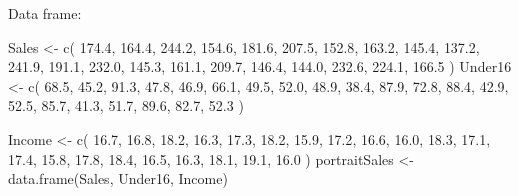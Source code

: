 \documentclass[
]{article}
\newenvironment{Shaded}{\begin{snugshade}}{\end{snugshade}}
\newcommand{\FloatTok}[1]{\textcolor[rgb]{0.00,0.00,0.81}{#1}}
\newcommand{\FunctionTok}[1]{\textcolor[rgb]{0.00,0.00,0.00}{#1}}
\newcommand{\NormalTok}[1]{#1}
\newcommand{\OtherTok}[1]{\textcolor[rgb]{0.56,0.35,0.01}{#1}}
\begin{document}
\hfill\break
Data frame:

\begin{Shaded}
\begin{Highlighting}[]
\NormalTok{Sales }\OtherTok{\textless{}{-}} \FunctionTok{c}\NormalTok{(}
  \FloatTok{174.4}\NormalTok{,}
  \FloatTok{164.4}\NormalTok{,}
  \FloatTok{244.2}\NormalTok{,}
  \FloatTok{154.6}\NormalTok{,}
  \FloatTok{181.6}\NormalTok{,}
  \FloatTok{207.5}\NormalTok{,}
  \FloatTok{152.8}\NormalTok{,}
  \FloatTok{163.2}\NormalTok{,}
  \FloatTok{145.4}\NormalTok{,}
  \FloatTok{137.2}\NormalTok{,}
  \FloatTok{241.9}\NormalTok{,}
  \FloatTok{191.1}\NormalTok{,}
  \FloatTok{232.0}\NormalTok{,}
  \FloatTok{145.3}\NormalTok{,}
  \FloatTok{161.1}\NormalTok{,}
  \FloatTok{209.7}\NormalTok{,}
  \FloatTok{146.4}\NormalTok{,}
  \FloatTok{144.0}\NormalTok{,}
  \FloatTok{232.6}\NormalTok{,}
  \FloatTok{224.1}\NormalTok{,}
  \FloatTok{166.5}
\NormalTok{)}
\NormalTok{Under16 }\OtherTok{\textless{}{-}} \FunctionTok{c}\NormalTok{(}
  \FloatTok{68.5}\NormalTok{,}
  \FloatTok{45.2}\NormalTok{,}
  \FloatTok{91.3}\NormalTok{,}
  \FloatTok{47.8}\NormalTok{,}
  \FloatTok{46.9}\NormalTok{,}
  \FloatTok{66.1}\NormalTok{,}
  \FloatTok{49.5}\NormalTok{,}
  \FloatTok{52.0}\NormalTok{,}
  \FloatTok{48.9}\NormalTok{,}
  \FloatTok{38.4}\NormalTok{,}
  \FloatTok{87.9}\NormalTok{,}
  \FloatTok{72.8}\NormalTok{,}
  \FloatTok{88.4}\NormalTok{,}
  \FloatTok{42.9}\NormalTok{,}
  \FloatTok{52.5}\NormalTok{,}
  \FloatTok{85.7}\NormalTok{,}
  \FloatTok{41.3}\NormalTok{,}
  \FloatTok{51.7}\NormalTok{,}
  \FloatTok{89.6}\NormalTok{,}
  \FloatTok{82.7}\NormalTok{,}
  \FloatTok{52.3}
\NormalTok{)}
\end{Highlighting}
\end{Shaded}

\begin{Shaded}
\begin{Highlighting}[]
\NormalTok{Income }\OtherTok{\textless{}{-}}
  \FunctionTok{c}\NormalTok{(}
    \FloatTok{16.7}\NormalTok{,}
    \FloatTok{16.8}\NormalTok{,}
    \FloatTok{18.2}\NormalTok{,}
    \FloatTok{16.3}\NormalTok{,}
    \FloatTok{17.3}\NormalTok{,}
    \FloatTok{18.2}\NormalTok{,}
    \FloatTok{15.9}\NormalTok{,}
    \FloatTok{17.2}\NormalTok{,}
    \FloatTok{16.6}\NormalTok{,}
    \FloatTok{16.0}\NormalTok{,}
    \FloatTok{18.3}\NormalTok{,}
    \FloatTok{17.1}\NormalTok{,}
    \FloatTok{17.4}\NormalTok{,}
    \FloatTok{15.8}\NormalTok{,}
    \FloatTok{17.8}\NormalTok{,}
    \FloatTok{18.4}\NormalTok{,}
    \FloatTok{16.5}\NormalTok{,}
    \FloatTok{16.3}\NormalTok{,}
    \FloatTok{18.1}\NormalTok{,}
    \FloatTok{19.1}\NormalTok{,}
    \FloatTok{16.0}
\NormalTok{  )}
\NormalTok{portraitSales }\OtherTok{\textless{}{-}} \FunctionTok{data.frame}\NormalTok{(Sales, Under16, Income)}
\end{Highlighting}
\end{Shaded}
\end{document}

